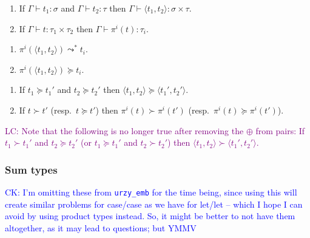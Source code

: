 \documentclass[runningheads,a4paper]{llncs}
\newcommand{\pair}[2]{\langle #1,#2 \rangle}
\newcommand{\flatten}{\mathtt{flatten}}
\newcommand{\lift}{\mathtt{lift}}
\newcommand{\proves}{\vdash}
\newcommand{\CK}[1]{\textcolor{blue}{CK: #1}}
\newcommand{\LC}[1]{\textcolor{purple}{LC: #1}}
\begin{document}
\begin{lemma}
  \begin{enumerate}
  \item If $\Gamma \proves t_1 : \sigma$ and $\Gamma \proves t_2 :
    \tau$ then $\Gamma \proves \pair{t_1}{t_2} : \sigma \times \tau$.
  \item If $\Gamma \proves t : \tau_1 \times \tau_2$ then $\Gamma
    \proves \pi^i(t) : \tau_i$.
  \end{enumerate}
\end{lemma}

\begin{lemma}\label{lem:projectreduce}
  \begin{enumerate}
  \item $\pi^i(\pair{t_1}{t_2}) \leadsto^* t_i %
    $.
  \item $\pi^i(\pair{t_1}{t_2}) \succeq t_i$.
  \end{enumerate}
\end{lemma}

\begin{lemma}
  \begin{enumerate}
  \item If $t_1 \succeq t_1'$ and $t_2 \succeq t_2'$ then
    $\pair{t_1}{t_2} \succeq \pair{t_1'}{t_2'}$.
  \item If $t \succ t'$ (resp.~$t \succeq t'$) then $\pi^i(t) \succ
    \pi^i(t')$ (resp.~$\pi^i(t)\succeq \pi^i(t')$).
  \end{enumerate}
\end{lemma}

\LC{Note that the following is no longer true after removing the
  $\oplus$ from pairs: If $t_1 \succ t_1'$ and $t_2 \succeq t_2'$ (or
  $t_1 \succeq t_1'$ and $t_2 \succ t_2'$) then $\pair{t_1}{t_2} \succ
  \pair{t_1'}{t_2'}$.}

\subsubsection{Sum types}
\CK{I'm omitting these from \texttt{urzy\_emb} for the time being,
since using this will create similar problems for case/case as we have
for let/let -- which I hope I can avoid by using product types instead.
So, it might be better to not have them altogether, as it may lead to
questions; but YMMV}
\end{document}
